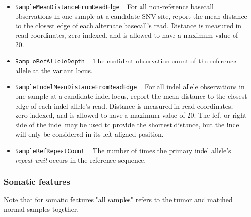 \documentclass{article}
\begin{document}
\begin{itemize}
    \item \texttt{SampleMeanDistanceFromReadEdge} ~ For all non-reference basecall observations in one sample at a candidate SNV site, report the mean distance to the closest edge of each alternate basecall's read. Distance is measured in read-coordinates, zero-indexed, and is allowed to have a maximum value of 20.

    \item \texttt{SampleRefAlleleDepth} ~ The confident observation count of the reference allele at the variant locus.

    \item \texttt{SampleIndelMeanDistanceFromReadEdge} ~ For all indel allele observations in one sample at a candidate indel locus, report the mean distance to the closest edge of each indel allele's read. Distance is measured in read-coordinates, zero-indexed, and is allowed to have a maximum value of 20. The left or right side of the indel may be used to provide the shortest distance, but the indel will only be considered in its left-aligned position.

    \item \texttt{SampleRefRepeatCount} ~ The number of times the primary indel allele's \emph{repeat unit} occurs in the reference sequence.

\end{itemize}


\subsubsection{Somatic features}

Note that for somatic features "all samples" refers to the tumor and matched normal samples together.
\end{document}
